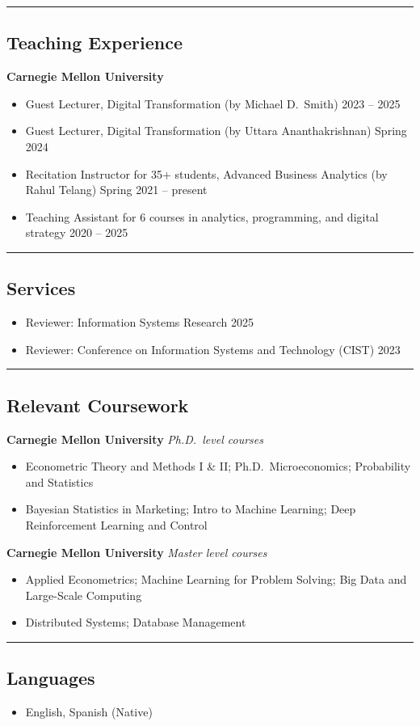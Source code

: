 \documentclass[10pt,letterpaper]{article}
\newcommand{\hsep}{\noindent\textcolor{gray}{\rule{\textwidth}{0.5pt}}}
\newcommand{\block}[1]{\begin{samepage}\hsep\subsection*{#1}\end{samepage}}
\begin{document}
\block{Teaching Experience}

\textbf{Carnegie Mellon University}

\begin{itemize}[leftmargin=0pt, label={}]
\item Guest Lecturer, Digital Transformation (by Michael D.\ Smith) \hfill 2023 -- 2025
\item Guest Lecturer, Digital Transformation (by Uttara Ananthakrishnan) \hfill Spring 2024
\item Recitation Instructor for 35+ students, Advanced Business Analytics (by Rahul Telang) \hfill Spring 2021 -- present
\item Teaching Assistant for 6 courses in analytics, programming, and digital strategy \hfill 2020 -- 2025
\end{itemize}

\block{Services}

\begin{itemize}[leftmargin=0pt, label={}]
\item Reviewer: Information Systems Research \hfill 2025
\item Reviewer: Conference on Information Systems and Technology (CIST) \hfill 2023
\end{itemize}

\block{Relevant Coursework}

\textbf{Carnegie Mellon University} \textit{Ph.D.\ level courses}
\begin{itemize}[leftmargin=0pt, label={}]
\item Econometric Theory and Methods I \& II; Ph.D.\ Microeconomics; Probability and Statistics
\item Bayesian Statistics in Marketing; Intro to Machine Learning; Deep Reinforcement Learning and Control
\end{itemize}

\textbf{Carnegie Mellon University} \textit{Master level courses}
\begin{itemize}[leftmargin=0pt, label={}]
\item Applied Econometrics; Machine Learning for Problem Solving; Big Data and Large-Scale Computing
\item Distributed Systems; Database Management
\end{itemize}

\block{Languages}

\begin{itemize}[leftmargin=0pt, label={}]
\item English, Spanish (Native)
\end{itemize}
\end{document}
